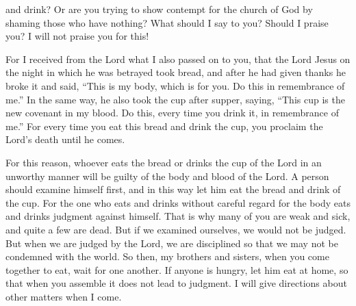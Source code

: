 {and
drink? Or
are you trying to show contempt
for the church
of God
by shaming
those who have
nothing? What
should I say
to you? Should I praise
you? I will
not
praise
you for
this!
\par }{\PP {}For
I
received
from
the Lord
what
I
also
passed on
to you,
that
the Lord
Jesus
on
the night
in which
he was betrayed
took
bread,
and
after
he had given thanks
he broke
it and
said,
“This
is
my
body,
which is for
you.
Do
this
in
remembrance
of me.”
In the same way,
he also took the cup
after
supper,
saying,
“This
cup
is
the new
covenant
in
my
blood.
Do
this,
every time
you drink
it, in
remembrance
of me.”
For
every time
you eat
this
bread
and
drink
the cup,
you proclaim
the Lord’s
death
until
he comes.
\par }{\PP {}For this reason,
whoever
eats
the bread
or
drinks
the cup
of the Lord
in an unworthy manner
will be
guilty
of the body
and
blood
of the Lord.
A person
should examine
himself
first, and
in this way
let him eat
the bread
and
drink
of
the cup.
For
the one who eats
and
drinks
without
careful regard
for the body
eats and drinks
judgment
against himself.
That
is why many
of you
are weak
and
sick,
and
quite a few
are dead.
But
if
we examined
ourselves,
we would
not
be judged.
But
when
we are judged
by
the Lord,
we are disciplined
so that
we may
not
be condemned
with
the world.
So then,
my
brothers and sisters,
when
you come together
to eat,
wait for
one another.
If
anyone
is hungry,
let him eat
at
home,
so
that when you assemble
it does not
lead to
judgment.
I will give directions
about other matters
when
I come.

}

